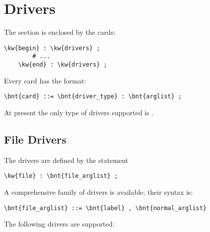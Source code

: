 %
%
%
%
%
% 
%
%

\chapter{Drivers}\label{sec:DRIVERS}
The  section is enclosed by the cards:
\begin{Verbatim}[commandchars=\\\{\}]
    \kw{begin} : \kw{drivers} ;
        # ...
    \kw{end} : \kw{drivers} ;
\end{Verbatim}
Every  card has the format:
\begin{Verbatim}[commandchars=\\\{\}]
    \bnt{card} ::= \bnt{driver_type} : \bnt{arglist} ;
\end{Verbatim}
At present the only type  of drivers supported is .

\section{File Drivers}
The  drivers are defined by the statement
\begin{Verbatim}[commandchars=\\\{\}]
    \kw{file} : \bnt{file_arglist} ;
\end{Verbatim}
A comprehensive family of  drivers is available;
their syntax is:
\begin{Verbatim}[commandchars=\\\{\}]
    \bnt{file_arglist} ::= \bnt{label} , \bnt{normal_arglist}
\end{Verbatim}
The following  drivers are supported:




